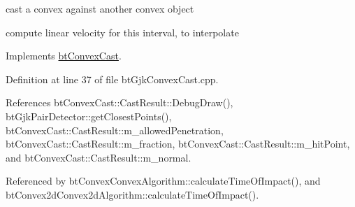 cast a convex against another convex object 



compute linear velocity for this interval, to interpolate 

Implements \hyperlink{classbt_convex_cast_baf0f25a8cccfcafdaabada83c8d2bfb}{btConvexCast}.

Definition at line 37 of file btGjkConvexCast.cpp.

References btConvexCast::CastResult::DebugDraw(), btGjkPairDetector::getClosestPoints(), btConvexCast::CastResult::m\_\-allowedPenetration, btConvexCast::CastResult::m\_\-fraction, btConvexCast::CastResult::m\_\-hitPoint, and btConvexCast::CastResult::m\_\-normal.

Referenced by btConvexConvexAlgorithm::calculateTimeOfImpact(), and btConvex2dConvex2dAlgorithm::calculateTimeOfImpact().


